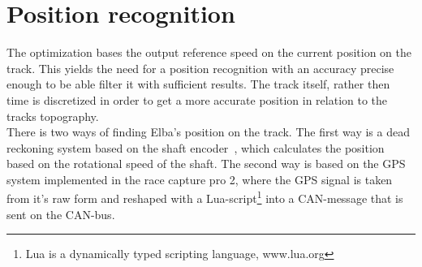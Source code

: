 \section{Position recognition}
The optimization bases the output reference speed on the current position on the
track. This yields the need for a position recognition with an accuracy precise
enough to be able filter it with sufficient results. The track itself, rather
then time is discretized in order to get a more accurate position in relation to
the tracks topography. \\
There is two ways of finding Elba's position on the track. The first way is a dead
reckoning system based on the shaft encoder~\cite[p.~49]{elba2015},
which calculates the position based on the rotational speed of the shaft. The
second way is based on the GPS system implemented in the race capture pro 2,
where the GPS signal is taken from it's raw form and reshaped with a
Lua-script\footnote{Lua is a dynamically typed scripting language, www.lua.org}
into a CAN-message that is sent on the CAN-bus.

